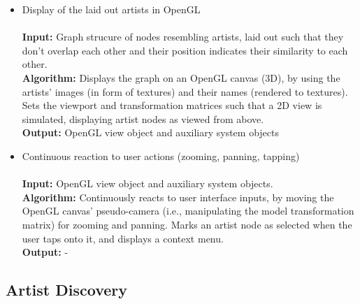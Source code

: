\begin{itemize}
	\item Display of the laid out artists in OpenGL	\\\\
				\textbf{Input:} Graph strucure of nodes resembling artists, laid out such that they don't 
				overlap each other and their position indicates their similarity to each other. \\
				\textbf{Algorithm:} Displays the graph on an OpenGL canvas (3D), by using the artists' images (in form
				of textures) and their names (rendered to textures). Sets the viewport and transformation
				matrices such that a 2D view is simulated, displaying artist nodes as viewed from above. \\
				\textbf{Output:} OpenGL view object and auxiliary system objects \\
				
	\item Continuous reaction to user actions (zooming, panning, tapping) \\\\
				\textbf{Input:} OpenGL view object and auxiliary system objects. \\
				\textbf{Algorithm:} Continuously reacts to user interface inputs, by moving the OpenGL canvas'
				pseudo-camera (i.e., manipulating the model transformation matrix) for zooming and panning.
				Marks an artist node as selected when the user taps onto it, and displays a context menu. \\
				\textbf{Output:} -
\end{itemize}

\subsection{Artist Discovery}


